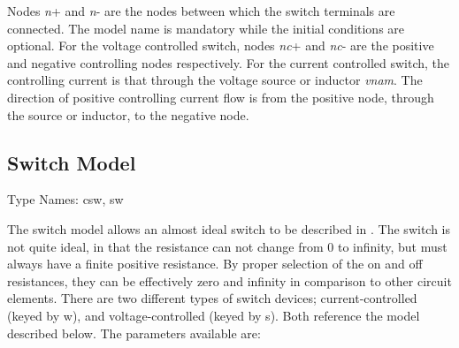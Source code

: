 

Nodes {\it n\/}{\vt +} and {\it n\/}{\vt -} are the nodes between
which the switch terminals are connected.  The {\vt model} name is
mandatory while the initial conditions are optional.  For the voltage
controlled switch, nodes {\it nc\/}{\vt +} and {\it nc\/}{\vt -} are
the positive and negative controlling nodes respectively.  For the
current controlled switch, the controlling current is that through the
voltage source or inductor {\it vnam}.  The direction of positive
controlling current flow is from the positive node, through the source
or inductor, to the negative node.

\subsection{Switch Model}
\label{swmodel}


{\cb Type Names:} {\vt csw}, {\vt sw}

The switch model allows an almost ideal switch to be described in
{\WRspice}.  The switch is not quite ideal, in that the resistance can
not change from 0 to infinity, but must always have a finite positive
resistance.  By proper selection of the on and off resistances, they
can be effectively zero and infinity in comparison to other circuit
elements.  There are two different types of switch devices;
current-controlled (keyed by {\vt w}), and voltage-controlled (keyed
by {\vt s}).  Both reference the model described below.  The
parameters available are:

